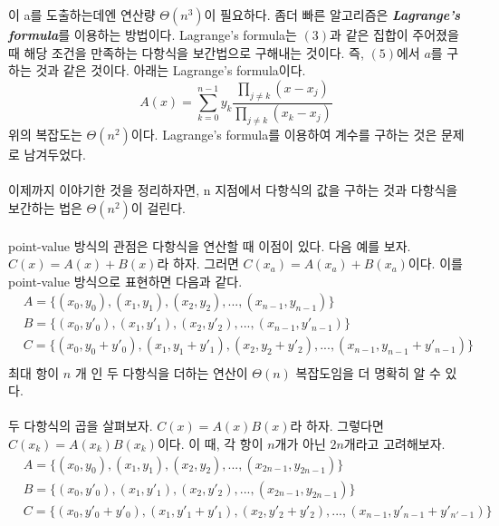 \documentclass{article}
\begin{document}
이 a를 도출하는데엔 연산량 $\Theta (n^3)$이 필요하다. 
좀더 빠른 알고리즘은 \textit{\textbf{Lagrange's formula}}를 이용하는 방법이다. 
Lagrange's formula는 $(3)$과 같은 집합이 주어졌을 때 해당 조건을 만족하는 다항식을 보간법으로 구해내는 것이다. 
즉, $(5)$에서 $a$를 구하는 것과 같은 것이다. 아래는 Lagrange's formula이다. 
$$
A(x) = \sum_{k=0}^{n-1}y_k\frac{\prod_{j \ne k}(x - x_j)}{\prod_{j \ne k }(x_k - x_j)}
$$
위의 복잡도는 $\Theta (n^2)$이다. Lagrange's formula를 이용하여 계수를 구하는 것은 문제로 남겨두었다.
\\\\
이제까지 이야기한 것을 정리하자면, n 지점에서 다항식의 값을 구하는 것과 다항식을 보간하는 법은 $\Theta (n^2)$이 걸린다. 
\\\\
point-value 방식의 관점은 다항식을 연산할 때 이점이 있다. 다음 예를 보자. $C(x)  = A(x) + B(x)$라 하자. 그러면 $C(x_a) = A(x_a) + B(x_a)$이다. 
이를 point-value 방식으로 표현하면 다음과 같다.
\begin{align*}
&A = \{(x_0, y_0), (x_1, y_1), (x_2, y_2), ... , (x_{n-1}, y_{n-1})\}\\
&B = \{(x_0, y'_0), (x_1, y'_1), (x_2, y'_2), ... , (x_{n-1}, y'_{n-1})\}\\
&C = \{(x_0, y_0+y'_0), (x_1, y_1+y'_1), (x_2, y_2+y'_2), ... , (x_{n-1}, y_{n-1}+y'_{n-1})\}\\
\end{align*}
최대 항이 $n$ 개 인 두 다항식을 더하는 연산이 $\Theta (n)$ 복잡도임을 더 명확히 알 수 있다.
\\\\
두 다항식의 곱을 살펴보자. $C(x)=A(x)B(x)$라 하자. 그렇다면 $C(x_k) =A(x_k)B(x_k)$이다. 이 때, 각 항이 $n$개가 아닌 $2n$개라고 고려해보자. 
\begin{align*}
&A = \{(x_0, y_0), (x_1, y_1), (x_2, y_2), ... , (x_{2n-1}, y_{2n-1})\}\\
&B = \{(x_0, y'_0), (x_1, y'_1), (x_2, y'_2), ... , (x_{2n-1}, y_{2n-1})\}\\
&C = \{(x_0, y'_0+y'_0), (x_1, y'_1+y'_1), (x_2, y'_2+y'_2), ... , (x_{n-1}, y'_{n-1}+y'_{n'-1})\}\\
\end{align*}
\end{document}
